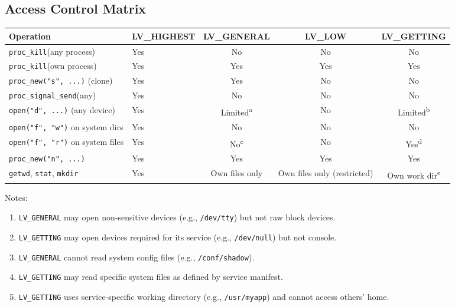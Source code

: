 \documentclass[12pt,a4paper]{article}
\begin{document}
\subsection{Access Control Matrix}
\begin{table}[htbp]
\centering
\small
\begin{tabularx}{\textwidth}{|l|X|c|c|c|}
\hline
\textbf{Operation} & \textbf{LV\_HIGHEST} & \textbf{LV\_GENERAL} & \textbf{LV\_LOW} & \textbf{LV\_GETTING} \\
\hline
\texttt{proc\_kill}(any process) & Yes & No & No & No \\
\texttt{proc\_kill}(own process) & Yes & Yes & Yes & Yes \\
\texttt{proc\_new("s", ...)} (clone) & Yes & Yes & No & No \\
\texttt{proc\_signal\_send}(any) & Yes & No & No & No \\
\texttt{open("d", ...)} (any device) & Yes & Limited\textsuperscript{a} & No & Limited\textsuperscript{b} \\
\texttt{open("f", "w")} on system dirs & Yes & No & No & No \\
\texttt{open("f", "r")} on system files & Yes & No\textsuperscript{c} & No & Yes\textsuperscript{d} \\
\texttt{proc\_new("n", ...)} & Yes & Yes & Yes & Yes \\
\texttt{getwd}, \texttt{stat}, \texttt{mkdir} & Yes & Own files only & Own files only (restricted) & Own work dir\textsuperscript{e} \\
\hline
\end{tabularx}
\end{table}
Notes:
\begin{enumerate}
    \item \texttt{LV\_GENERAL} may open non‑sensitive devices (e.g., \texttt{/dev/tty}) but not raw block devices.
    \item \texttt{LV\_GETTING} may open devices required for its service (e.g., \texttt{/dev/null}) but not console.
    \item \texttt{LV\_GENERAL} cannot read system config files (e.g., \texttt{/conf/shadow}).
    \item \texttt{LV\_GETTING} may read specific system files as defined by service manifest.
    \item \texttt{LV\_GETTING} uses service‑specific working directory (e.g., \texttt{/usr/myapp}) and cannot access others' home.
\end{enumerate}
\end{document}
